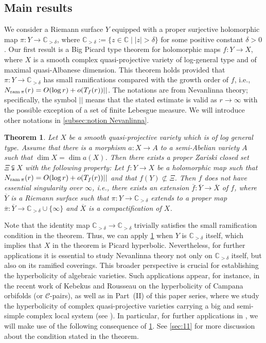 \documentclass[11pt,english]{smfart}
\theoremstyle{plain}
\newtheorem{thmx}{Theorem}
\theoremstyle{definition}
\theoremstyle{remark}
\numberwithin{equation}{section}
\theoremstyle{plain}
\newcommand{\bC}{\mathbb{C}}
\newcommand{\ram}{{\rm ram}\,}
\begin{document}
 

 
 



\subsection{Main results}
We consider a Riemann surface $Y$ equipped with a proper surjective holomorphic map 
$\pi:Y\to\mathbb C_{>\delta}$, 
where $\mathbb C_{>\delta}:=\{z\in\bC \mid |z|>\delta\}$
for some positive constant $\delta>0$.
	Our first result is a Big Picard type theorem for holomorphic maps $f:Y \to X$, where $X$ is a smooth complex quasi-projective variety of log-general type and of maximal quasi-Albanese dimension.
	This theorem holds provided that $\pi:Y\to\mathbb C_{>\delta}$ has small ramifications compared with the growth order of $f$, i.e., $N_{\ram\pi}(r)=O(\log r)+o(T_f(r))||$.
	The notations are from Nevanlinna theory; specifically, the symbol $||$ means that the stated estimate is valid as $r\to\infty$ with the possible exception of a set of finite Lebesgue measure. 
	We will introduce other notations in \cref{subsec:notion Nevanlinna}.
	
	

	 	\begin{thmx}\label{thm2nd}
		Let $X$ be a smooth quasi-projective variety which is of log general type.
		Assume that there is a morphism $a:X\to A$ to a semi-Abelian variety $A$ such that $\dim X=\dim a(X)$.
		Then there exists a proper Zariski closed set $\Xi\subsetneqq X$ with the following property:
		Let $f:Y\to X$ be a holomorphic map such that $N_{\ram\pi}(r)=O(\log r)+o(T_f(r))||$ and that $f(Y)\not\subset \Xi$.
		Then $f$ does not have essential singularity over $\infty$, i.e.,	there exists an extension $\overline{f}:\overline{Y}\to\overline{X}$ of $f$, where $\overline{Y}$ is a Riemann surface such that  $\pi:Y\to \mathbb C_{>\delta}$ extends to a proper map $\overline{\pi}:\overline{Y}\to \mathbb C_{>\delta}\cup\{\infty\}$  
		and $\overline{X}$ is a compactification of $X$.	
	\end{thmx}
	
	
	Note that the identity map $\mathbb C_{>\delta}\to \mathbb C_{>\delta}$ trivially satisfies the small ramification condition in the theorem.
	Thus, we can apply \cref{thm2nd} when $Y$ is $\mathbb C_{>\delta}$ itself, which implies that $X$ in the theorem is Picard hyperbolic. 
 Nevertheless, for further applications it is essential to study Nevanlinna theory not only on $\mathbb{C}_{>\delta}$ itself, but also on its ramified coverings. 
This broader perspective is crucial for establishing the hyperbolicity of algebraic varieties. 
Such applications appear, for instance, in the recent work of Kebekus and Rousseau \cite{KR24} on the hyperbolicity of Campana orbifolds (or $\mathcal{C}$-pairs), as well as in Part~(II) of this paper series, where we study the hyperbolicity of complex quasi-projective varieties carrying a big and semi-simple complex local system (see \cite[Theorems~A, C \& D]{CDY22}).  
In particular, for further applications  in \cite{CDY22}, we will make use of the following consequence of \cref{thm2nd}.
See \cref{sec:11} for more discussion about the condition stated in the theorem.
\end{document}
